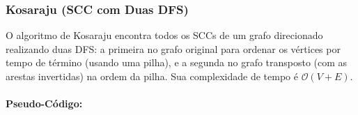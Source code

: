 \subsubsection{Kosaraju (SCC com Duas DFS)}
O algoritmo de Kosaraju encontra todos os SCCs de um grafo direcionado
realizando duas DFS: a primeira no grafo original para ordenar os vértices por
tempo de término (usando uma pilha), e a segunda no grafo transposto (com as
arestas invertidas) na ordem da pilha. Sua complexidade de tempo é
$\mathcal{O}(V + E)$.

\paragraph{Pseudo-Código: }\mbox{}\\
\begin{algorithm}[H]
    \SetAlgoLined

    \caption{Algoritmo de Kosaraju}
\end{algorithm}

